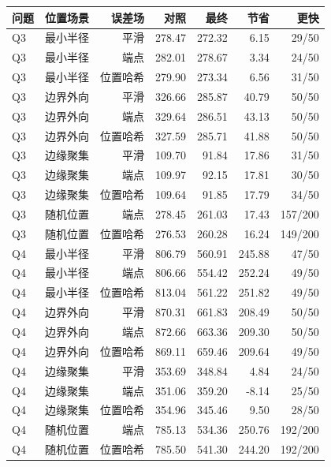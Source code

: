 \begin{tabular}{lrrrrrr}
\toprule
问题 & 位置场景 & 误差场 & 对照 & 最终 & 节省 & 更快 \\
\midrule
Q3 & 最小半径 & 平滑 & 278.47 & 272.32 & 6.15 & 29/50 \\
Q3 & 最小半径 & 端点 & 282.01 & 278.67 & 3.34 & 24/50 \\
Q3 & 最小半径 & 位置哈希 & 279.90 & 273.34 & 6.56 & 31/50 \\
Q3 & 边界外向 & 平滑 & 326.66 & 285.87 & 40.79 & 50/50 \\
Q3 & 边界外向 & 端点 & 329.64 & 286.51 & 43.13 & 50/50 \\
Q3 & 边界外向 & 位置哈希 & 327.59 & 285.71 & 41.88 & 50/50 \\
Q3 & 边缘聚集 & 平滑 & 109.70 & 91.84 & 17.86 & 31/50 \\
Q3 & 边缘聚集 & 端点 & 109.97 & 92.15 & 17.81 & 30/50 \\
Q3 & 边缘聚集 & 位置哈希 & 109.64 & 91.85 & 17.79 & 34/50 \\
Q3 & 随机位置 & 端点 & 278.45 & 261.03 & 17.43 & 157/200 \\
Q3 & 随机位置 & 位置哈希 & 276.53 & 260.28 & 16.24 & 149/200 \\
Q4 & 最小半径 & 平滑 & 806.79 & 560.91 & 245.88 & 47/50 \\
Q4 & 最小半径 & 端点 & 806.66 & 554.42 & 252.24 & 49/50 \\
Q4 & 最小半径 & 位置哈希 & 813.04 & 561.22 & 251.82 & 49/50 \\
Q4 & 边界外向 & 平滑 & 870.31 & 661.83 & 208.49 & 50/50 \\
Q4 & 边界外向 & 端点 & 872.66 & 663.36 & 209.30 & 50/50 \\
Q4 & 边界外向 & 位置哈希 & 869.11 & 659.46 & 209.64 & 49/50 \\
Q4 & 边缘聚集 & 平滑 & 353.69 & 348.84 & 4.84 & 24/50 \\
Q4 & 边缘聚集 & 端点 & 351.06 & 359.20 & -8.14 & 25/50 \\
Q4 & 边缘聚集 & 位置哈希 & 354.96 & 345.46 & 9.50 & 28/50 \\
Q4 & 随机位置 & 端点 & 785.13 & 534.36 & 250.76 & 192/200 \\
Q4 & 随机位置 & 位置哈希 & 785.50 & 541.30 & 244.20 & 192/200 \\
\bottomrule
\end{tabular}
